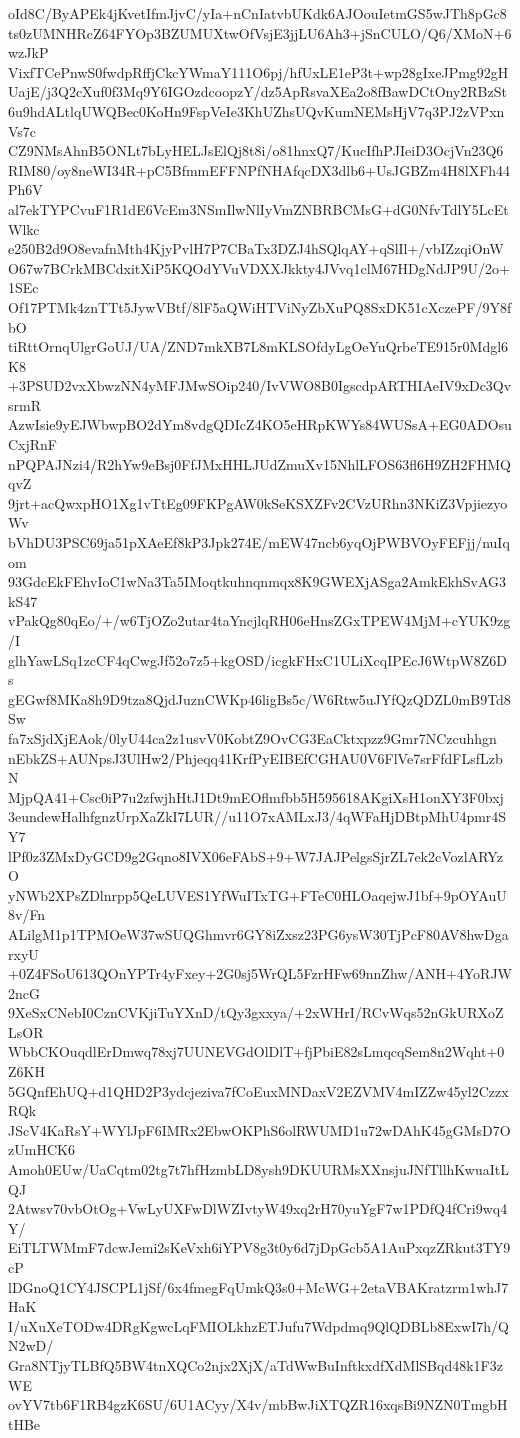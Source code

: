 oId8C/ByAPEk4jKvetIfmJjvC/yIa+nCnIatvbUKdk6AJOouIetmGS5wJTh8pGc8
ts0zUMNHRcZ64FYOp3BZUMUXtwOfVsjE3jjLU6Ah3+jSnCULO/Q6/XMoN+6wzJkP
VixfTCePnwS0fwdpRffjCkcYWmaY111O6pj/hfUxLE1eP3t+wp28gIxeJPmg92gH
UajE/j3Q2cXuf0f3Mq9Y6IGOzdcoopzY/dz5ApRsvaXEa2o8fBawDCtOny2RBzSt
6u9hdALtlqUWQBec0KoHn9FspVeIe3KhUZhsUQvKumNEMsHjV7q3PJ2zVPxnVs7c
CZ9NMsAhnB5ONLt7bLyHELJsElQj8t8i/o81hnxQ7/KucIfhPJIeiD3OcjVn23Q6
RIM80/oy8neWI34R+pC5BfmmEFFNPfNHAfqcDX3dlb6+UsJGBZm4H8lXFh44Ph6V
al7ekTYPCvuF1R1dE6VcEm3NSmIlwNlIyVmZNBRBCMsG+dG0NfvTdlY5LcEtWlkc
e250B2d9O8evafnMth4KjyPvlH7P7CBaTx3DZJ4hSQlqAY+qSlIl+/vbIZzqiOnW
O67w7BCrkMBCdxitXiP5KQOdYVuVDXXJkkty4JVvq1clM67HDgNdJP9U/2o+1SEc
Of17PTMk4znTTt5JywVBtf/8lF5aQWiHTViNyZbXuPQ8SxDK51cXczePF/9Y8fbO
tiRttOrnqUlgrGoUJ/UA/ZND7mkXB7L8mKLSOfdyLgOeYuQrbeTE915r0Mdgl6K8
+3PSUD2vxXbwzNN4yMFJMwSOip240/IvVWO8B0IgscdpARTHIAeIV9xDc3QvsrmR
AzwIsie9yEJWbwpBO2dYm8vdgQDIcZ4KO5eHRpKWYs84WUSsA+EG0ADOsuCxjRnF
nPQPAJNzi4/R2hYw9eBsj0FfJMxHHLJUdZmuXv15NhlLFOS63fl6H9ZH2FHMQqvZ
9jrt+acQwxpHO1Xg1vTtEg09FKPgAW0kSeKSXZFv2CVzURhn3NKiZ3VpjiezyoWv
bVhDU3PSC69ja51pXAeEf8kP3Jpk274E/mEW47ncb6yqOjPWBVOyFEFjj/nuIqom
93GdcEkFEhvIoC1wNa3Ta5IMoqtkuhnqnmqx8K9GWEXjASga2AmkEkhSvAG3kS47
vPakQg80qEo/+/w6TjOZo2utar4taYncjlqRH06eHnsZGxTPEW4MjM+cYUK9zg/I
glhYawLSq1zcCF4qCwgJf52o7z5+kgOSD/icgkFHxC1ULiXcqIPEcJ6WtpW8Z6Ds
gEGwf8MKa8h9D9tza8QjdJuznCWKp46ligBs5c/W6Rtw5uJYfQzQDZL0mB9Td8Sw
fa7xSjdXjEAok/0lyU44ca2z1usvV0KobtZ9OvCG3EaCktxpzz9Gmr7NCzcuhhgn
nEbkZS+AUNpsJ3UlHw2/Phjeqq41KrfPyEIBEfCGHAU0V6FlVe7srFfdFLsfLzbN
MjpQA41+Csc0iP7u2zfwjhHtJ1Dt9mEOflmfbb5H595618AKgiXsH1onXY3F0bxj
3eundewHalhfgnzUrpXaZkI7LUR//u11O7xAMLxJ3/4qWFaHjDBtpMhU4pmr4SY7
lPf0z3ZMxDyGCD9g2Gqno8IVX06eFAbS+9+W7JAJPelgsSjrZL7ek2cVozlARYzO
yNWb2XPsZDlnrpp5QeLUVES1YfWuITxTG+FTeC0HLOaqejwJ1bf+9pOYAuU8v/Fn
ALilgM1p1TPMOeW37wSUQGhmvr6GY8iZxsz23PG6ysW30TjPcF80AV8hwDgarxyU
+0Z4FSoU613QOnYPTr4yFxey+2G0sj5WrQL5FzrHFw69nnZhw/ANH+4YoRJW2ncG
9XeSxCNebI0CznCVKjiTuYXnD/tQy3gxxya/+2xWHrI/RCvWqs52nGkURXoZLsOR
WbbCKOuqdlErDmwq78xj7UUNEVGdOlDlT+fjPbiE82sLmqcqSem8n2Wqht+0Z6KH
5GQnfEhUQ+d1QHD2P3ydcjeziva7fCoEuxMNDaxV2EZVMV4mIZZw45yl2CzzxRQk
JScV4KaRsY+WYlJpF6IMRx2EbwOKPhS6olRWUMD1u72wDAhK45gGMsD7OzUmHCK6
Amoh0EUw/UaCqtm02tg7t7hfHzmbLD8ysh9DKUURMsXXnsjuJNfTllhKwuaItLQJ
2Atwsv70vbOtOg+VwLyUXFwDlWZIvtyW49xq2rH70yuYgF7w1PDfQ4fCri9wq4Y/
EiTLTWMmF7dcwJemi2sKeVxh6iYPV8g3t0y6d7jDpGcb5A1AuPxqzZRkut3TY9cP
lDGnoQ1CY4JSCPL1jSf/6x4fmegFqUmkQ3s0+McWG+2etaVBAKratzrm1whJ7HaK
I/uXuXeTODw4DRgKgwcLqFMIOLkhzETJufu7Wdpdmq9QlQDBLb8ExwI7h/QN2wD/
Gra8NTjyTLBfQ5BW4tnXQCo2njx2XjX/aTdWwBuInftkxdfXdMlSBqd48k1F3zWE
ovYV7tb6F1RB4gzK6SU/6U1ACyy/X4v/mbBwJiXTQZR16xqsBi9NZN0TmgbHtHBe
